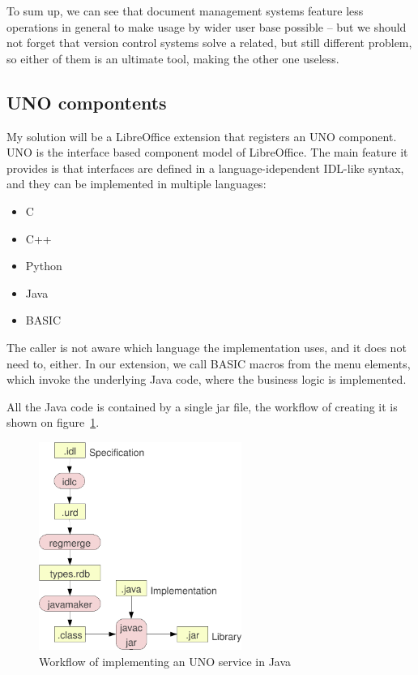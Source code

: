 To sum up, we can see that document management systems feature less operations
in general to make usage by wider user base possible -- but we should not
forget that version control systems solve a related, but still different
problem, so either of them is an ultimate tool, making the other one useless.

\subsection{UNO compontents}

My solution will be a LibreOffice extension that registers an UNO\cite{uno}
component. UNO is the interface based component model of LibreOffice. The main
feature it provides is that interfaces are defined in a language-idependent
IDL-like syntax, and they can be implemented in multiple languages:

\begin{itemize}
\item C
\item C++
\item Python
\item Java
\item BASIC
\end{itemize}

The caller is not aware which language the implementation uses, and it does not
need to, either. In our extension, we call BASIC macros from the menu elements,
which invoke the underlying Java code, where the business logic is implemented.

All the Java code is contained by a single jar file, the workflow of creating
it is shown on figure~\ref{fig:uno-java}.

\begin{figure}[H]
\centering
\includegraphics[width=250px,keepaspectratio]{uno-java.pdf}
\caption{Workflow of implementing an UNO service in Java}
\label{fig:uno-java}
\end{figure}

